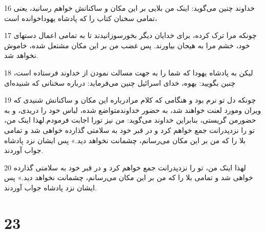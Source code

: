 \par 16 خداوند چنین می‌گوید: اینک من بلایی بر این مکان و ساکنانش خواهم رسانید، یعنی تمامی سخنان کتاب را که پادشاه یهوداخوانده است،
\par 17 چونکه مرا ترک کرده، برای خدایان دیگر بخور‌سوزانیدند تا به تمامی اعمال دستهای خود، خشم مرا به هیجان بیاورند. پس غضب من بر این مکان مشتعل شده، خاموش نخواهد شد.
\par 18 لیکن به پادشاه یهودا که شما را به جهت مسالت نمودن از خداوند فرستاده است، چنین بگویید: یهوه، خدای اسرائیل چنین می‌فرماید: درباره سخنانی که شنیده‌ای
\par 19 چونکه دل تو نرم بود و هنگامی که کلام مرادرباره این مکان و ساکنانش شنیدی که ویران ومورد لعنت خواهند شد، به حضور خداوندمتواضع شده، لباس خود را دریدی، و به حضورمن گریستی، بنابراین خداوند می‌گوید: من نیز تورا اجابت فرمودم.لهذا اینک من، تو را نزدپدرانت جمع خواهم کرد و در قبر خود به سلامتی گذارده خواهی شد و تمامی بلا را که من بر این مکان می‌رسانم، چشمانت نخواهد دید.» پس ایشان نزد پادشاه جواب آوردند.
\par 20 لهذا اینک من، تو را نزدپدرانت جمع خواهم کرد و در قبر خود به سلامتی گذارده خواهی شد و تمامی بلا را که من بر این مکان می‌رسانم، چشمانت نخواهد دید.» پس ایشان نزد پادشاه جواب آوردند.
 
\chapter{23}

